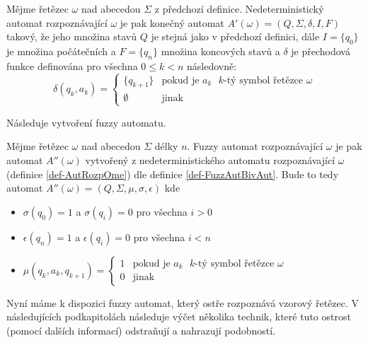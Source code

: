 \documentclass[a4paper,10pt]{article}
\begin{document}
\begin{definition} \label{def-AutRozpOme}
  Mějme řetězec $\omega$ nad abecedou $\Sigma$ z předchozí definice. Nedeterministický automat rozpoznávající $\omega$ je pak konečný automat $A'(\omega) = ( Q, \Sigma, \delta, I, F )$ takový, že jeho množina stavů $Q$ je stejná jako v předchozí definici, dále $I = \{ q_0 \}$ je množina počátečních a $F = \{ q_n \}$ množina koncových stavů a $\delta$ je přechodová funkce definována pro všechna $0 \leq k < n$ následovně:
  $$
  \delta(q_{k}, a_k) = 
  \begin{cases}
      \{ q_{k+1} \}	&\text{pokud je $a_k$ $k$-tý symbol řetězce $\omega$} \\
      \emptyset	&\text{jinak}
  \end{cases}
  $$
\end{definition}

Následuje vytvoření fuzzy automatu.

\begin{definition} \label{def-FuzzAutRozpOme}
  Mějme řetězec $\omega$ nad abecedou $\Sigma$ délky $n$. Fuzzy automat rozpoznávající $\omega$ je pak automat $A''(\omega)$ vytvořený z nedeterministického automatu rozpoznávající $\omega$ (definice \ref{def-AutRozpOme}) dle definice \ref{def-FuzzAutBivAut}. Bude to tedy automat $A''(\omega) = ( Q, \Sigma, \mu, \sigma, \epsilon )$ kde
  \begin{itemize}
   \item $\sigma(q_0) = 1$ a $\sigma(q_i) = 0$ pro všechna $i > 0$
   \item $\epsilon(q_n) = 1$ a $\epsilon(q_i) = 0$ pro všechna $i < n$
   \item $\mu(q_{k}, a_k, q_{k+1}) = 
      \begin{cases}
	1		&\text{pokud je $a_k$ $k$-tý symbol řetězce $\omega$} \\
	0		&\text{jinak}
      \end{cases}
      $
  \end{itemize}
\end{definition}

Nyní máme k dispozici fuzzy automat, který ostře rozpoznává vzorový řetězec. V následujících podkapitolách následuje výčet několika technik, které tuto ostrost (pomocí dalších informací) odstraňují a nahrazují podobností.
\end{document}
